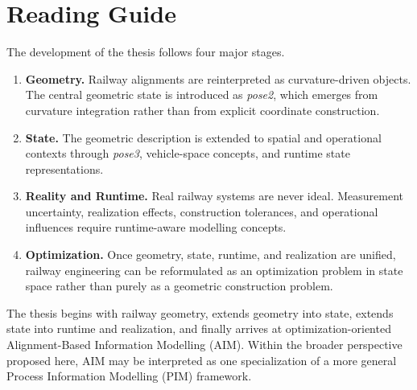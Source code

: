 \section*{Reading Guide}

The development of the thesis follows four major stages.

\begin{enumerate}

\item
\textbf{Geometry.}
Railway alignments are reinterpreted as curvature-driven objects. The
central geometric state is introduced as \emph{pose2}, which emerges
from curvature integration rather than from explicit coordinate
construction.

\item
\textbf{State.}
The geometric description is extended to spatial and operational
contexts through \emph{pose3}, vehicle-space concepts, and runtime
state representations.

\item
\textbf{Reality and Runtime.}
Real railway systems are never ideal. Measurement uncertainty,
realization effects, construction tolerances, and operational
influences require runtime-aware modelling concepts.

\item
\textbf{Optimization.}
Once geometry, state, runtime, and realization are unified, railway
engineering can be reformulated as an optimization problem in state
space rather than purely as a geometric construction problem.

\end{enumerate}

The thesis begins with railway geometry, extends geometry into state,
extends state into runtime and realization, and finally arrives at
optimization-oriented Alignment-Based Information Modelling (AIM). Within
the broader perspective proposed here, AIM may be interpreted as one
specialization of a more general Process Information Modelling (PIM)
framework.
